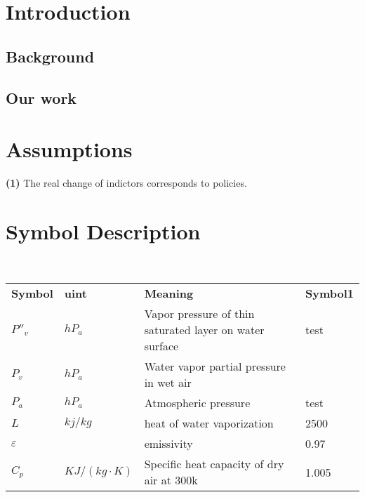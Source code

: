 \documentclass{mcmthesis}
\begin{document}
\setcounter{page}{1}
\section{Introduction}
\subsection{Background}%

\subsection{Our work}


\section{Assumptions}
\noindent
{\bf (1) } The real change of indictors corresponds to policies.\\

\section{Symbol Description}
\begin{table}[H]
        \setlength{\abovecaptionskip}{0pt}
        \setlength{\belowcaptionskip}{0pt}
				\\
        \begin{tabular}{p{2cm}|p{2cm}|p{7.5cm}|p{2cm}}
		\hline
		\rowcolor[gray]{0.9}\bf{Symbol}	&\bf{uint}      &\bf{Meaning}&\bf{Symbol1}	\\
		${P}''_{v}$		& $hP_{a}$		 & Vapor pressure of thin saturated layer on water surface  &test\\
		$P_{v}$		& $hP_{a}$		 & Water vapor partial pressure in wet air\\
		$P_{a}$		& $hP_{a}$		 & Atmospheric pressure  &test\\
		$L$		& $kj/kg$		 & heat of water vaporization&2500\\
		$\varepsilon$		& 		 & emissivity&0.97\\
		$C_{p}$		& $KJ/(kg\cdot K)$		 & Specific heat capacity of dry air at 300k &1.005\\
		\hline
		\end{tabular}
	\end{table}
\end{document}
